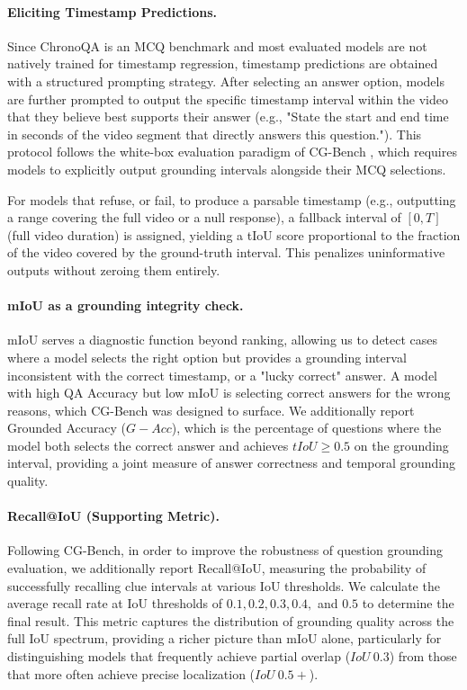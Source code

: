 \documentclass[sigconf,natbib=false,nonacm]{acmart}
\begin{document}
\paragraph{\textbf{Eliciting Timestamp Predictions.}}
Since ChronoQA is an MCQ benchmark and most evaluated models are not natively trained for timestamp regression, timestamp predictions are obtained with a structured prompting strategy. After selecting an answer option, models are further prompted to output the specific timestamp interval within the video that they believe best supports their answer (e.g., "State the start and end time in seconds of the video segment that directly answers this question."). This protocol follows the white-box evaluation paradigm of CG-Bench \cite{cgbench}, which requires models to explicitly output grounding intervals alongside their MCQ selections.

For models that refuse, or fail, to produce a parsable timestamp (e.g., outputting a range covering the full video or a null response), a fallback interval of $[0, T]$ (full video duration) is assigned, yielding a tIoU score proportional to the fraction of the video covered by the ground-truth interval. This penalizes uninformative outputs without zeroing them entirely.

\paragraph{\textbf{mIoU as a grounding integrity check.}}
mIoU serves a diagnostic function beyond ranking, allowing us to detect cases where a model selects the right option but provides a grounding interval inconsistent with the correct timestamp, or a "lucky correct" answer. A model with high QA Accuracy but low mIoU is selecting correct answers for the wrong reasons, which CG-Bench \cite{cgbench} was designed to surface. We additionally report Grounded Accuracy ($G-Acc$), which is the percentage of questions where the model both selects the correct answer and achieves $tIoU \geq 0.5$ on the grounding interval, providing a joint measure of answer correctness and temporal grounding quality.

\paragraph{\textbf{Recall@IoU (Supporting Metric).}}
Following CG-Bench, in order to improve the robustness of question grounding evaluation, we additionally report Recall@IoU, measuring the probability of successfully recalling clue intervals at various IoU thresholds. We calculate the average recall rate at IoU thresholds of $0.1, 0.2, 0.3, 0.4,$ and $0.5$ to determine the final result. This metric captures the distribution of grounding quality across the full IoU spectrum, providing a richer picture than mIoU alone, particularly for distinguishing models that frequently achieve partial overlap ($IoU ~0.3$) from those that more often achieve precise localization ($IoU ~0.5+$).
\end{document}
